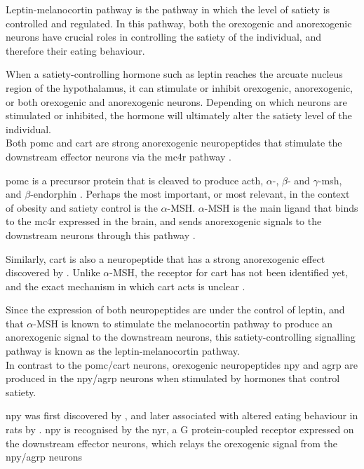 Leptin-melanocortin pathway is the pathway in which the level of satiety is controlled and regulated.
In this pathway, both the orexogenic and anorexogenic neurons have crucial roles in controlling the satiety of the individual, and therefore their eating behaviour.

When a satiety-controlling hormone such as leptin reaches the arcuate nucleus region of the hypothalamus, it can stimulate or inhibit orexogenic, anorexogenic, or both orexogenic and anorexogenic neurons.
Depending on which neurons are stimulated or inhibited, the hormone will ultimately alter the satiety level of the individual.\\

\noindent
Both \gls{pomc} and \gls{cart} are strong anorexogenic neuropeptides that stimulate the downstream effector neurons via the \gls{mc4r} pathway \citep{Barsh2002}.

\gls{pomc} is a precursor protein that is cleaved to produce \gls{acth}, $\alpha$-, $\beta$- and $\gamma$-\gls{msh}, and $\beta$-endorphin \citep{Smith1988}.
Perhaps the most important, or most relevant, in the context of obesity and satiety control is the $\alpha$-MSH.
$\alpha$-MSH is the main ligand that binds to the \gls{mc4r} expressed in the brain, and sends anorexogenic signals to the downstream neurons through this pathway \citep{Krude1998}.

Similarly, \gls{cart} is also a neuropeptide that has a strong anorexogenic effect discovered by \citet{Kristensen1998}.
Unlike $\alpha$-MSH, the receptor for \gls{cart} has not been identified yet, and the exact mechanism in which \gls{cart} acts is unclear \citep{Kristensen1998, Rogge2008}.

Since the expression of both neuropeptides are under the control of leptin, and that $\alpha$-MSH is known to stimulate the melanocortin pathway to produce an anorexogenic signal to the downstream neurons, this satiety-controlling signalling pathway is known as the leptin-melanocortin pathway.
\\

\noindent
In contrast to the \gls{pomc}/\gls{cart} neurons, orexogenic neuropeptides \gls{npy} and \gls{agrp} are produced in the \gls{npy}/\gls{agrp} neurons when stimulated by hormones that control satiety.

\gls{npy} was first discovered by \citet{Tatemoto1982}, and later associated with altered eating behaviour in rats by \citet{Clark1984}.
\gls{npy} is recognised by the \gls{nyr}, a G protein-coupled receptor expressed on the downstream effector neurons, which relays the orexogenic signal from the \gls{npy}/\gls{agrp} neurons \citep{Barsh2002, Bell2005, Herzog1992}

